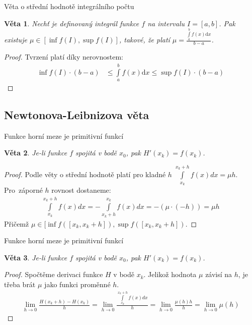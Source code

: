 \documentclass{beamer}
\newtheorem{thm}{Věta}
\theoremstyle{definition}
\theoremstyle{example}
\def\d{\mathrm{d}}
\begin{document}
\begin{frame}{Věta o střední hodnotě integrálního počtu}
	\begin{thm}
		Nechť je definovaný integrál funkce $f$ na intervalu $I = [a, b]$. Pak existuje $\mu \in [\inf f(I), \sup f(I)]$, takové, že platí $\mu = \frac{\int\limits_a^b f(x) \d x}{b - a}$.
	\end{thm}
	\begin{proof}
		Tvrzení platí díky nerovnostem:
		\begin{align*}
			\inf f(I) \cdot (b - a) &\leq \int\limits_a^b f(x) \d x \leq \sup f(I) \cdot (b - a)
		\end{align*}
	\end{proof}
\end{frame}

\subsection{Newtonova-Leibnizova věta}
\begin{frame}{Funkce horní meze je primitivní funkcí}
	\begin{thm}
		Je-li funkce $f$ spojitá v bodě $x_0$, pak $H'(x_k) = f(x_k)$.
	\end{thm}
	\begin{proof}\renewcommand{\qedsymbol}{}
		Podle věty o střední hodnotě platí pro kladné $h$ $\int\limits_{x_k}^{x_k + h} f(x) dx = \mu h$. Pro~záporné $h$ rovnost dostaneme:
		\begin{eqnarray*}
			\int\limits_{x_k}^{x_k + h} f(x) dx = -\int\limits_{x_k + h}^{x_k} f(x) dx = -(\mu  \cdot (-h)) = \mu h
		\end{eqnarray*}
		Přičemž $\mu \in [\inf f([x_k, x_k + h]), \sup f([x_k, x_k + h])$.
	\end{proof}
\end{frame}

\begin{frame}{Funkce horní meze je primitivní funkcí}
	\begin{thm}
		Je-li funkce $f$ spojitá v bodě $x_0$, pak $H'(x_k) = f(x_k)$.
	\end{thm}
	\begin{proof}\renewcommand{\qedsymbol}{}
		Spočtěme derivaci funkce $H$ v bodě $x_k$. Jelikož hodnota $\mu$ závisí na $h$, je třeba brát $\mu$ jako funkci proměnné $h$.
		\begin{align*}
			\lim_{h \rightarrow 0}\frac{H(x_k + h) - H(x_k)}{h} = \lim_{h \rightarrow 0}\frac{\int\limits_{x_k}^{x_k + h} f(x) dx}{h} = \lim_{h \rightarrow 0}\frac{\mu(h) h}{h} = \lim_{h \rightarrow 0}\mu(h)
		\end{align*}
	\end{proof}
\end{frame}
\end{document}
